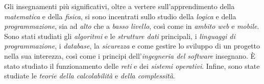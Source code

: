 {Gli insegnamenti più significativi, oltre a vertere sull'apprendimento della
\textit{matematica} e della \textit{fisica}, si sono incentrati sullo studio
della \textit{logica} e della \textit{programmazione}, sia ad \textit{alto} che
a \textit{basso livello}, così come in \textit{ambito web} e \textit{mobile}.
Sono stati studiati gli \textit{algoritmi} e le \textit{strutture dati}
principali, i \textit{linguaggi di programmazione}, i \textit{database}, la
\textit{sicurezza} e come gestire lo sviluppo di un progetto nella sua
interezza, così come i principi dell'\textit{ingegneria del software} insegnano.
È stato studiato il funzionamento delle \textit{reti} e dei \textit{sistemi
operativi}. Infine, sono state studiate le \textit{teorie della calcolabilità} e
\textit{della complessità}.}
